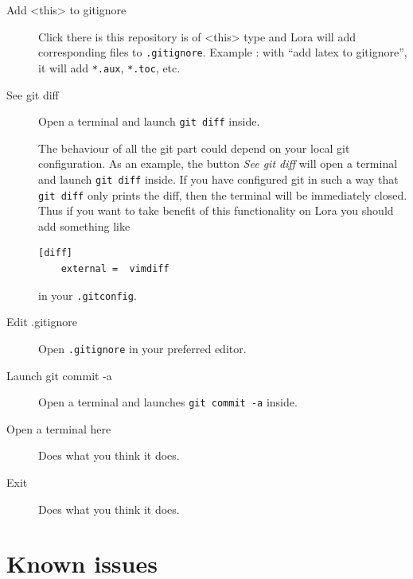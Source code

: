 \documentclass[a4paper,12pt]{article}
\newcommand{\info}[1]{\texttt{#1}}
\begin{document}
\begin{description} 
    \item[Add <this> to gitignore] Click there is this repository is of <this> type and Lora will add corresponding files to \info{.gitignore}. Example : with ``add latex to gitignore'', it will add \info{*.aux}, \info{*.toc}, etc.
    \item[See git diff]
        Open a terminal and launch \info{git diff} inside.  

        The behaviour of all the git part could depend on your local git configuration. As an example, the button \emph{See git diff} will open a terminal and launch \info{git diff} inside. If you have configured git in such a way that \info{git diff} only prints the diff, then the terminal will be immediately closed. Thus if you want to take benefit of this functionality on Lora you should add something like

\begin{verbatim}
[diff]
    external =  vimdiff
\end{verbatim}
in your \info{.gitconfig}.
    \item[Edit .gitignore] Open \info{.gitignore} in your preferred editor.
    \item[Launch git commit -a] Open a terminal and launches \info{git commit -a} inside.
    \item[Open a terminal here] Does what you think it does.
    \item[Exit] Does what you think it does.
\end{description}

\section{Known issues}
\end{document}
